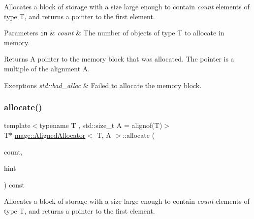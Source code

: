 Allocates a block of storage with a size large enough to contain {\itshape count} elements of type {\ttfamily T}, and returns a pointer to the first element.


\begin{DoxyParams}[1]{Parameters}
\mbox{\tt in}  & {\em count} & The number of objects of type {\ttfamily T} to allocate in memory. \\
\hline
\end{DoxyParams}
\begin{DoxyReturn}{Returns}
A pointer to the memory block that was allocated. The pointer is a multiple of the alignment {\ttfamily A}. 
\end{DoxyReturn}

\begin{DoxyExceptions}{Exceptions}
{\em std\+::bad\+\_\+alloc} & Failed to allocate the memory block. \\
\hline
\end{DoxyExceptions}
\mbox{\label{classmage_1_1_aligned_allocator_ad683d31cec6ec3729bec0972cc681800}} 
\subsubsection{\texorpdfstring{allocate()}{allocate()}\hspace{0.1cm}{\footnotesize\ttfamily [2/2]}}
{\footnotesize\ttfamily template$<$typename T , std\+::size\+\_\+t A = alignof(\+T)$>$ \\
T$\ast$ \mbox{\hyperlink{classmage_1_1_aligned_allocator}{mage\+::\+Aligned\+Allocator}}$<$ T, A $>$\+::allocate (\begin{DoxyParamCaption}\item[{std\+::size\+\_\+t}]{count,  }\item[{\mbox{[}\mbox{[}maybe\+\_\+unused\mbox{]} \mbox{]} const void $\ast$}]{hint }\end{DoxyParamCaption}) const}

Allocates a block of storage with a size large enough to contain {\itshape count} elements of type {\ttfamily T}, and returns a pointer to the first element.


